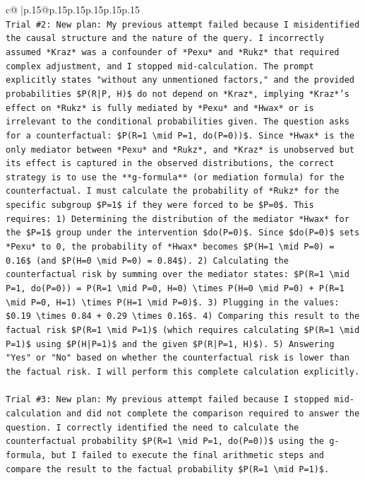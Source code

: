 \documentclass{article}
\begin{document}
{\begin{supertabular}{c@{$\;$}|p{.15\linewidth}@{}p{.15\linewidth}p{.15\linewidth}p{.15\linewidth}p{.15\linewidth}p{.15\linewidth}}
{{{\\ 
\texttt{Trial \#2: New plan: My previous attempt failed because I misidentified the causal structure and the nature of the query. I incorrectly assumed *Kraz* was a confounder of *Pexu* and *Rukz* that required complex adjustment, and I stopped mid{-}calculation. The prompt explicitly states "without any unmentioned factors," and the provided probabilities \$P(R|P, H)\$ do not depend on *Kraz*, implying *Kraz*'s effect on *Rukz* is fully mediated by *Pexu* and *Hwax* or is irrelevant to the conditional probabilities given. The question asks for a counterfactual: \$P(R=1 \textbackslash{}mid P=1, do(P=0))\$. Since *Hwax* is the only mediator between *Pexu* and *Rukz*, and *Kraz* is unobserved but its effect is captured in the observed distributions, the correct strategy is to use the **g{-}formula** (or mediation formula) for the counterfactual. I must calculate the probability of *Rukz* for the specific subgroup \$P=1\$ if they were forced to be \$P=0\$. This requires: 1) Determining the distribution of the mediator *Hwax* for the \$P=1\$ group under the intervention \$do(P=0)\$. Since \$do(P=0)\$ sets *Pexu* to 0, the probability of *Hwax* becomes \$P(H=1 \textbackslash{}mid P=0) = 0.16\$ (and \$P(H=0 \textbackslash{}mid P=0) = 0.84\$). 2) Calculating the counterfactual risk by summing over the mediator states: \$P(R=1 \textbackslash{}mid P=1, do(P=0)) = P(R=1 \textbackslash{}mid P=0, H=0) \textbackslash{}times P(H=0 \textbackslash{}mid P=0) + P(R=1 \textbackslash{}mid P=0, H=1) \textbackslash{}times P(H=1 \textbackslash{}mid P=0)\$. 3) Plugging in the values: \$0.19 \textbackslash{}times 0.84 + 0.29 \textbackslash{}times 0.16\$. 4) Comparing this result to the factual risk \$P(R=1 \textbackslash{}mid P=1)\$ (which requires calculating \$P(R=1 \textbackslash{}mid P=1)\$ using \$P(H|P=1)\$ and the given \$P(R|P=1, H)\$). 5) Answering "Yes" or "No" based on whether the counterfactual risk is lower than the factual risk. I will perform this complete calculation explicitly.} \\
\\ 
\texttt{Trial \#3: New plan: My previous attempt failed because I stopped mid{-}calculation and did not complete the comparison required to answer the question. I correctly identified the need to calculate the counterfactual probability \$P(R=1 \textbackslash{}mid P=1, do(P=0))\$ using the g{-}formula, but I failed to execute the final arithmetic steps and compare the result to the factual probability \$P(R=1 \textbackslash{}mid P=1)\$.} \\
}}}
\end{supertabular}}
\end{document}
